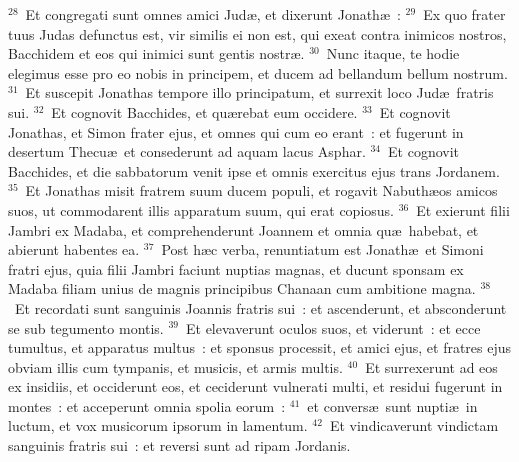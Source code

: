 ${}^{28}$~Et congregati sunt omnes amici Jud\ae , et dixerunt Jonath\ae~:
${}^{29}$~Ex quo frater tuus Judas defunctus est, vir similis ei non est, qui exeat contra inimicos nostros, Bacchidem et eos qui inimici sunt gentis nostr\ae .
${}^{30}$~Nunc itaque, te hodie elegimus esse pro eo nobis in principem, et ducem ad bellandum bellum nostrum.
${}^{31}$~Et suscepit Jonathas tempore illo principatum, et surrexit loco Jud\ae\ fratris sui.
${}^{32}$~Et cognovit Bacchides, et qu\ae rebat eum occidere.
${}^{33}$~Et cognovit Jonathas, et Simon frater ejus, et omnes qui cum eo erant~: et fugerunt in desertum Thecu\ae\ et consederunt ad aquam lacus Asphar.
${}^{34}$~Et cognovit Bacchides, et die sabbatorum venit ipse et omnis exercitus ejus trans Jordanem.
${}^{35}$~Et Jonathas misit fratrem suum ducem populi, et rogavit Nabuth\ae os amicos suos, ut commodarent illis apparatum suum, qui erat copiosus.
${}^{36}$~Et exierunt filii Jambri ex Madaba, et comprehenderunt Joannem et omnia qu\ae\ habebat, et abierunt habentes ea.
${}^{37}$~Post h\ae c verba, renuntiatum est Jonath\ae\ et Simoni fratri ejus, quia filii Jambri faciunt nuptias magnas, et ducunt sponsam ex Madaba filiam unius de magnis principibus Chanaan cum ambitione magna.
${}^{38}$~Et recordati sunt sanguinis Joannis fratris sui~: et ascenderunt, et absconderunt se sub tegumento montis.
${}^{39}$~Et elevaverunt oculos suos, et viderunt~: et ecce tumultus, et apparatus multus~: et sponsus processit, et amici ejus, et fratres ejus obviam illis cum tympanis, et musicis, et armis multis.
${}^{40}$~Et surrexerunt ad eos ex insidiis, et occiderunt eos, et ceciderunt vulnerati multi, et residui fugerunt in montes~: et acceperunt omnia spolia eorum~:
${}^{41}$~et convers\ae\ sunt nupti\ae\ in luctum, et vox musicorum ipsorum in lamentum.
${}^{42}$~Et vindicaverunt vindictam sanguinis fratris sui~: et reversi sunt ad ripam Jordanis.


